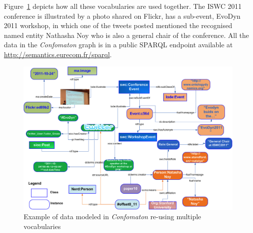 Figure~\ref{fig:natasha-example} depicts how all these vocabularies are used together. The ISWC 2011 conference is illustrated by a photo shared on Flickr, has a sub-event, EvoDyn 2011 workshop, in which one of the tweets posted mentioned the recognised named entity Nathasha Noy who is also a general chair of the conference. All the data in the \emph{Confomaton} graph is in a public SPARQL endpoint available at \url{http://semantics.eurecom.fr/sparql}.
\begin{figure}[t!h]
 \centering
 \includegraphics[scale=0.3]{img/natasha_example.png}
 \caption{Example of data modeled in \emph{Confomaton} re-using multiple vocabularies}
 \label{fig:natasha-example}
\end{figure}



